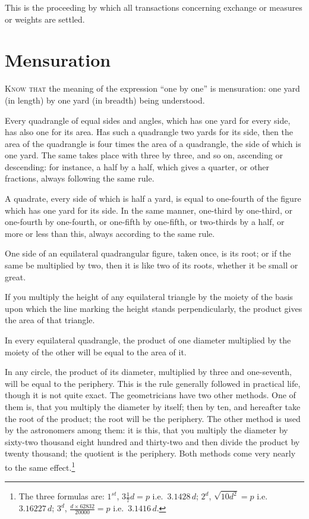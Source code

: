 This is the proceeding by which all transactions concerning exchange or measures or weights are settled.

\clearpage

\section*{Mensuration}

\lettrine{K}{now that} the meaning of the expression ``one by one'' is mensuration: one yard (in length) by one yard (in breadth) being understood.

Every quadrangle of equal sides and angles, which has one yard for every side, has also one for its area. Has such a quadrangle two yards for its side, then the area of the quadrangle is four times the area of a quadrangle, the side of which is one yard. The same takes place with three by three, and so on, ascending or descending: for instance, a half by a half, which gives a quarter, or other fractions, always following the same rule.

A quadrate, every side of which is half a yard, is equal to one-fourth of the figure which has one yard for its side. In the same manner, one-third by one-third, or one-fourth by one-fourth, or one-fifth by one-fifth, or two-thirds by a half, or more or less than this, always according to the same rule.

One side of an equilateral quadrangular figure, taken once, is its root; or if the same be multiplied by two, then it is like two of its roots, whether it be small or great.

If you multiply the height of any equilateral triangle by the moiety of the basis upon which the line marking the height stands perpendicularly, the product gives the area of that triangle.

In every equilateral quadrangle, the product of one diameter multiplied by the moiety of the other will be equal to the area of it.

In any circle, the product of its diameter, multiplied by three and one-seventh, will be equal to the periphery. This is the rule generally followed in practical life, though it is not quite exact. The geometricians have two other methods. One of them is, that you multiply the diameter by itself; then by ten, and hereafter take the root of the product; the root will be the periphery. The other method is used by the astronomers among them: it is this, that you multiply the diameter by sixty-two thousand eight hundred and thirty-two and then divide the product by twenty thousand; the quotient is the periphery. Both methods come very nearly to the same effect.\footnote{The three formulas are: $1^{st}$, $3\frac{1}{7}d = p$ i.e.~$3.1428\,d$; $2^{d}$, $\sqrt{10d^2} = p$ i.e.~$3.16227\,d$; $3^{d}$, $\frac{d \times 62832}{20000} = p$ i.e.~$3.1416\,d$.}


